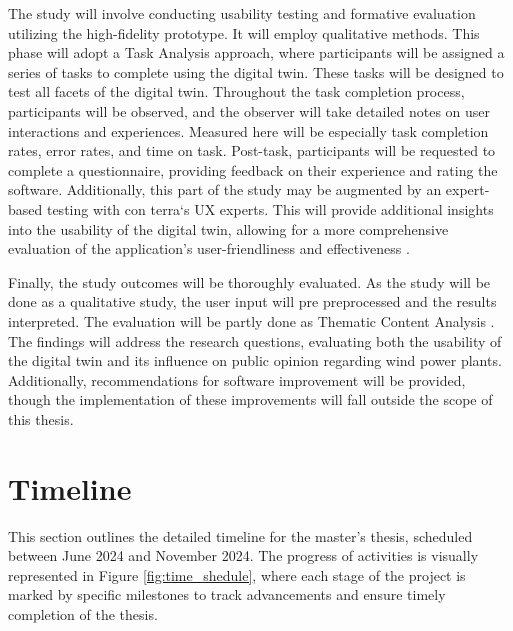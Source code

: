 \documentclass[11pt, titlepage, a4paper]{scrartcl}
\begin{document}
\begin{linenumbers}

    The study will involve conducting usability testing and formative evaluation utilizing the high-fidelity prototype. It will employ qualitative methods. This phase will adopt a Task Analysis approach, where participants will be assigned a series of tasks to complete using the digital twin. These tasks will be designed to test all facets of the digital twin. Throughout the task completion process, participants will be observed, and the observer will take detailed notes on user interactions and experiences. Measured here will be especially task completion rates, error rates, and time on task.
    Post-task, participants will be requested to complete a questionnaire, providing feedback on their experience and rating the software. Additionally, this part of the study may be augmented by an expert-based testing with con terra`s UX experts. This will provide additional insights into the usability of the digital twin, allowing for a more comprehensive evaluation of the application's user-friendliness and effectiveness \cite{lazarResearchMethodsHuman2017}.


    Finally, the study outcomes will be thoroughly evaluated. As the study will be done as a qualitative study, the user input will pre preprocessed and the results interpreted. The evaluation will be partly done as Thematic Content Analysis \cite{lazarResearchMethodsHuman2017}. The findings will address the research questions, evaluating both the usability of the digital twin and its influence on public opinion regarding wind power plants. Additionally, recommendations for software improvement will be provided, though the implementation of these improvements will fall outside the scope of this thesis.


    \section{Timeline}
    This section outlines the detailed timeline for the master's thesis, scheduled between June 2024 and November 2024.
    The progress of activities is visually represented in Figure \ref{fig:time_shedule}, where each stage of the project is marked by specific milestones to track advancements and ensure timely completion of the thesis.



\end{linenumbers}
\end{document}
